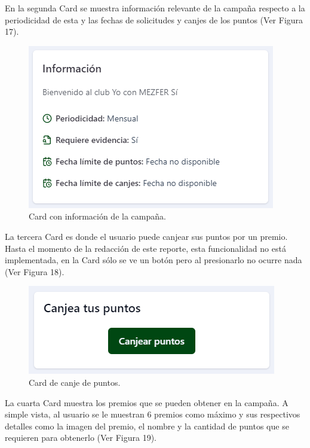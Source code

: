 En la segunda Card se muestra información relevante de la campaña respecto a la periodicidad de esta y las fechas de solicitudes y canjes de los puntos (Ver Figura 17).

    \begin{figure}[H]
        \begin{center}
            \includegraphics[scale=0.60]{img/actividades/detalles-campanias/card-info-puntos.png}
            \caption{Card con información de la campaña.}
            \label{fig:card-info-campanias}
        \end{center}
    \end{figure}

La tercera Card es donde el usuario puede canjear sus puntos por un premio. Hasta el momento de la redacción de este reporte, esta funcionalidad no está implementada, en la Card sólo se ve un botón pero al presionarlo no ocurre nada (Ver Figura 18).

    \begin{figure}[H]
        \begin{center}
            \includegraphics[scale=0.60]{img/actividades/detalles-campanias/card-canje.png}
            \caption{Card de canje de puntos.}
            \label{fig:card-canje}
        \end{center}
    \end{figure}

La cuarta Card muestra los premios que se pueden obtener en la campaña. A simple vista, al usuario se le muestran 6 premios como máximo y sus respectivos detalles como la imagen del premio, el nombre y la cantidad de puntos que se requieren para obtenerlo (Ver Figura 19).

